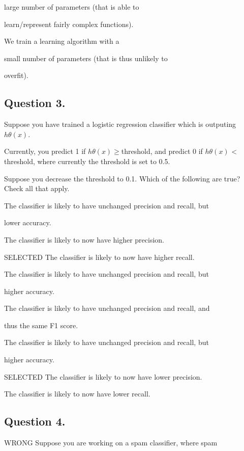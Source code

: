 \documentclass[11pt]{article} %
\begin{document}
large number of parameters (that is able to

learn/represent fairly complex functions).



We train a learning algorithm with a

small number of parameters (that is thus unlikely to

overfit).

\subsection{Question 3.}


Suppose you have trained a logistic regression classifier which is outputing $h\theta(x)$.


Currently, you predict 1 if $h\theta(x) \geq $threshold, and predict 
0 if $h\theta(x)$ < threshold, where currently the threshold is set to 0.5.

Suppose you decrease the threshold to 0.1. Which of the following are true? Check all that apply.

The classifier is likely to have unchanged precision and recall, but

lower accuracy.

The classifier is likely to now have higher precision.

SELECTED The classifier is likely to now have higher recall.

The classifier is likely to have unchanged precision and recall, but

higher accuracy.


The classifier is likely to have unchanged precision and recall, and

thus the same F1 score.

The classifier is likely to have unchanged precision and recall, but

higher accuracy.


SELECTED The classifier is likely to now have lower precision.

The classifier is likely to now have lower recall.
\subsection*{Question 4.} WRONG
Suppose you are working on a spam classifier, where spam
\end{document}
